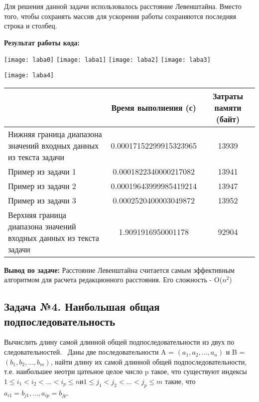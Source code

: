 \begin{code}
	\inputminted[breaklines=true, xleftmargin=1em, linenos, frame=single, framesep=10pt, fontsize=\footnotesize, firstline=1, lastline=33]{haskell}{listings/3.py}
\end{code}
Для решения данной задачи использовалось расстояние Левенштайна. Вместо того, чтобы сохранять массив для ускорения работы сохраняются последняя строка и столбец.
\newline

\textbf{Результат работы кода:}

\begin{center}
\texttt{[image: laba0]}
\texttt{[image: laba1]}
\texttt{[image: laba2]}
\texttt{[image: laba3]}
\vspace*{1cm}

\texttt{[image: laba4]}
\end{center}
\newpage
\begin{tabular}{|p{4cm}|c|c|}
    \hline
     & Время выполнения (с) & Затраты памяти (байт) \\ \hline
    Нижняя граница диапазона значений входных данных из текста задачи & 0.00017152299915323965 & 13939 \\ \hline
    Пример из задачи 1 & 0.0001822340000217082 & 13941 \\ \hline
    Пример из задачи 2 & 0.00019643999985419214 & 13947 \\ \hline
    Пример из задачи 3 & 0.0002520400003049872 & 13952 \\ \hline
    Верхняя граница диапазона значений входных данных из текста задачи & 1.9091916950001178 & 92904 \\ \hline
\end{tabular}
\vspace*{0.5cm}
\newline
\textbf{Вывод по задаче:} Расстояние Левенштайна считается самым эффективным алгоритмом для расчета редакционного расстояния. Его сложность - O(\(n^2\))

\subsection{Задача №4. Наибольшая общая подпоследовательность}
Вычислить длину самой длинной общей подпоследовательности из двух по следовательностей. 
Даны две последовательности A = \((a_1, a_2, ..., a_n)\) и B = \((b_1, b_2, ..., b_m)\), найти длину их самой длинной общей подпоследовательности, т.е. наибольшее неотри цатеьное целое число p такое, что существуют индексы \(1 ≤ i_1 < i_2 < ... < i_p ≤ n и 1 ≤ j_1 < j_2 < ... < j_p ≤ m \) такие, что \(a_{i1} = b_{j1}, ..., a_{ip} = b_{jp}\). 

